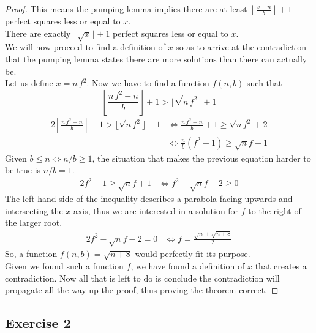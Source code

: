 \documentclass[docid=TP07]{tcom_TP}
\begin{document}
{\begin{proof}
This means the pumping lemma implies there are at least $\left\lfloor \frac{x-n}{b} \right\rfloor +1$ perfect squares less or equal to $x$.\\
There are exactly $\lfloor \sqrt{x} \rfloor +1$ perfect squares less or equal to $x$.\\
We will now proceed to find a definition of $x$ so as to arrive at the contradiction that the pumping lemma states there are more solutions than there can actually be.\\
Let us define $x=n\,f^2$. Now we have to find a function $f(n,b)$ such that
\begin{equation*}
	\left\lfloor \frac{n\,f^2-n}{b} \right\rfloor +1 > \lfloor \sqrt{n\,f^2} \rfloor +1
\end{equation*}
\begin{alignat*}{2}
	\left\lfloor \frac{n\,f^2-n}{b} \right\rfloor +1 > \lfloor \sqrt{n\,f^2} \rfloor +1
	&\iff \frac{n\,f^2-n}{b}+1 \geq \sqrt{n\,f^2} +2 \\
	&\iff \frac{n}{b}(f^2-1) \geq \sqrt{n}f + 1
\end{alignat*}
Given $b \leq n \iff n/b \geq 1$, the situation that makes the previous equation harder to be true is $n/b=1$.
\begin{alignat*}{2}
	f^2-1 \geq \sqrt{n}f + 1
	&\iff f^2-\sqrt{n}f-2 \geq 0
\end{alignat*}
The left-hand side of the inequality describes a parabola facing upwards and intersecting the $x$-axis, thus we are interested in a solution for $f$ to the right of the larger root.
 \begin{alignat*}{2}
	f^2-\sqrt{n}f-2 = 0
	&\iff f = \frac{\sqrt{n}+\sqrt{n+8}}{2}
\end{alignat*}
So, a function $f(n,b)=\sqrt{n+8}$ would perfectly fit its purpose.\\
Given we found such a function $f$, we have found a definition of $x$ that creates a contradiction. Now all that is left to do is conclude the contradiction will propagate all the way up the proof, thus proving the theorem correct.
\end{proof}
\subsection{Exercise 2}
}
\end{document}
